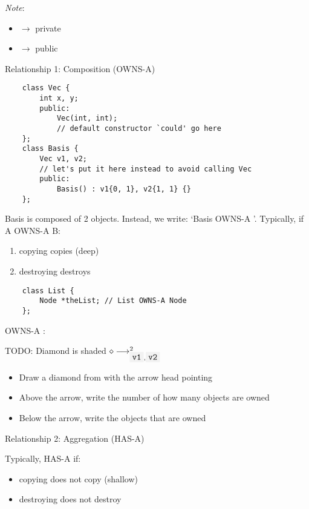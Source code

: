 \emph{Note}:
\begin{itemize}
    \item \code{-} $ \rightarrow $ private
    \item \code{+} $ \rightarrow $ public
\end{itemize}

Relationship 1: Composition (OWNS-A)
\begin{lstlisting}
    class Vec {
        int x, y;
        public:
            Vec(int, int);
            // default constructor `could' go here
    };
    class Basis {
        Vec v1, v2;
        // let's put it here instead to avoid calling Vec
        public:
            Basis() : v1{0, 1}, v2{1, 1} {}
    };
\end{lstlisting}

Basis is composed of 2  objects. Instead, we write:
`Basis OWNS-A '. Typically, if A OWNS-A B:
\begin{enumerate}[(1)]
    \item copying  copies  (deep)
    \item destroying  destroys 
\end{enumerate}

\begin{lstlisting}
    class List {
        Node *theList; // List OWNS-A Node
    };
\end{lstlisting}

 OWNS-A :

TODO: Diamond is shaded
$ \diamond\longrightarrow^2_{\code{v1}, \code{v2}} $
\begin{itemize}
    \item Draw a diamond from  with the arrow head
          pointing 
    \item Above the arrow, write the number of how many objects are owned
    \item Below the arrow, write the objects that are owned
\end{itemize}

Relationship 2: Aggregation (HAS-A)

Typically,  HAS-A  if:
\begin{itemize}
    \item copying  does not copy  (shallow)
    \item destroying  does not destroy 
\end{itemize}

